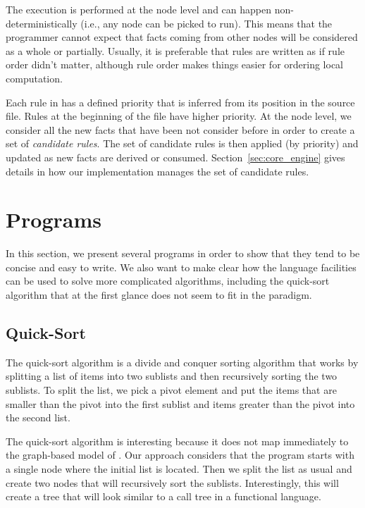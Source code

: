 The execution is performed at the node level and can happen non-deterministically (i.e., any node can
be picked to run). This means that the programmer cannot expect
that facts coming from other nodes will be considered as a whole or partially.
Usually, it is preferable that rules are written as if rule order didn't matter, although
rule order makes things easier for ordering local computation.

Each rule in \lang has a defined priority that is inferred from its position in the source file.
Rules at the beginning of the file have higher priority. At the node level, we consider all
the new facts that have been not consider before in order to create a set of \emph{candidate rules}.
The set of candidate rules is then applied (by priority) and updated as new facts are derived or consumed.
Section~\ref{sec:core_engine} gives details in how our implementation manages the set of candidate rules.

\section{Programs}

In this section, we present several \lang programs in order to show that they tend to be concise and
easy to write. We also want to make clear how the language facilities can be used to solve more
complicated algorithms, including the quick-sort algorithm that at the first glance does not seem
to fit in the \lang paradigm.

\subsection{Quick-Sort}

The quick-sort algorithm is a divide and conquer sorting algorithm that works by splitting
a list of items into two sublists and then recursively sorting the two sublists.
To split the list, we pick a pivot element and put the items that are smaller than the pivot
into the first sublist and items greater than the pivot into the second list.

The quick-sort algorithm is interesting because it does not map immediately to the graph-based
model of \lang. Our approach considers that the program starts with a single node where
the initial list is located. Then we split the list as usual and create two nodes
that will recursively sort the sublists. Interestingly, this will create a tree
that will look similar to a call tree in a functional language.

